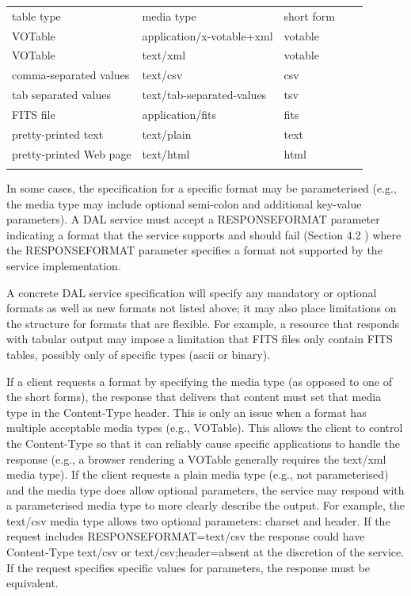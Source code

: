 \documentclass[11pt,letter]{ivoa}
\begin{document}
\begin{tabular}{l l l l l}
\sptablerule
table type & media type & short form \\
\sptablerule
VOTable & application/x-votable+xml & votable & \\
VOTable & text/xml & votable & \\
comma-separated values & text/csv & csv & \\
tab separated values & text/tab-separated-values & tsv & \\
FITS file & application/fits & fits & \\
pretty-printed text & text/plain & text & \\
pretty-printed Web page & text/html & html & \\
\sptablerule
\label{tab:mimetypes}
\end{tabular}

In some cases, the specification for a specific format may be parameterised 
(e.g., the media type may include optional semi-colon and additional key-value 
parameters). A DAL service must accept a RESPONSEFORMAT parameter indicating a 
format that the service supports and should  fail (Section 4.2 ) where the 
RESPONSEFORMAT parameter specifies a format not supported by the service 
implementation.

A concrete DAL service specification will specify any mandatory or optional 
formats as well as new formats not listed above; it may also place limitations 
on the structure for formats that are flexible.  For example, a resource that 
responds with tabular output may impose a limitation that FITS files only 
contain FITS tables, possibly only of specific types (ascii or binary).

If a client requests a format by specifying the media type (as opposed to one of 
the short forms), the response that delivers that content must set that
media type 
in the Content-Type header. This is only an issue when a format has multiple 
acceptable media types (e.g., VOTable). This allows the client to control the 
Content-Type so that it can reliably cause specific applications to handle the 
response (e.g., a browser rendering a VOTable generally requires the text/xml 
media type). If the client requests a plain media type (e.g., not parameterised) and 
the media type does allow optional parameters, the service may respond with a 
parameterised media type to more clearly describe the output. For example, the 
text/csv media type allows two optional parameters: charset and header. If the 
request includes RESPONSEFORMAT=text/csv the response could have Content-Type 
text/csv or text/csv;header=absent at the discretion of the service. If the 
request specifies specific values for parameters, the response must be 
equivalent.
\end{document}
